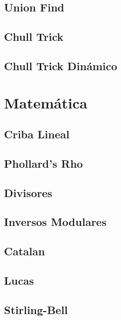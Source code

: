 \documentclass[a4paper,11pt,landscape,twocolumn]{article}
\begin{document}
\subsection{Union Find}

\subsection{Chull Trick}

\subsection{Chull Trick Dinámico}


\section{Matemática} %
\subsection{Criba Lineal}

\subsection{Phollard's Rho}

\subsection{Divisores}

\subsection{Inversos Modulares}


\subsection{Catalan}

\subsection{Lucas}

\subsection{Stirling-Bell}

\end{document}

